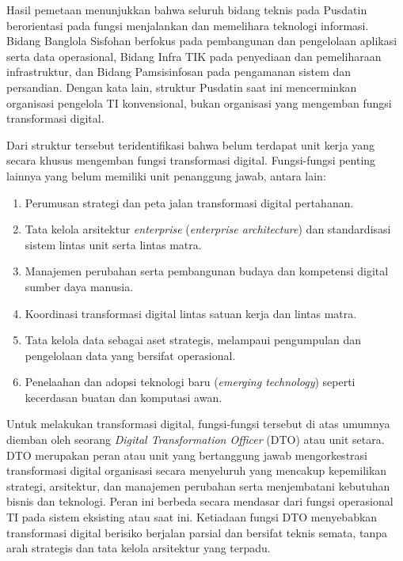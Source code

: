 Hasil pemetaan menunjukkan bahwa seluruh bidang teknis pada Pusdatin berorientasi pada fungsi menjalankan dan memelihara teknologi informasi.
Bidang Banglola Sisfohan berfokus pada pembangunan dan pengelolaan aplikasi serta data operasional, Bidang Infra TIK pada penyediaan dan pemeliharaan infrastruktur, dan Bidang Pamsisinfosan pada pengamanan sistem dan persandian.
Dengan kata lain, struktur Pusdatin saat ini mencerminkan organisasi pengelola TI konvensional, bukan organisasi yang mengemban fungsi transformasi digital.

Dari struktur tersebut teridentifikasi bahwa belum terdapat unit kerja yang secara khusus mengemban fungsi transformasi digital. Fungsi-fungsi penting lainnya yang belum memiliki unit penanggung jawab, antara lain:
\begin{enumerate}
  \item Perumusan strategi dan peta jalan transformasi digital pertahanan.
  \item Tata kelola arsitektur \textit{enterprise} (\textit{enterprise architecture}) dan standardisasi sistem lintas unit serta lintas matra.
  \item Manajemen perubahan serta pembangunan budaya dan kompetensi digital sumber daya manusia.
  \item Koordinasi transformasi digital lintas satuan kerja dan lintas matra.
  \item Tata kelola data sebagai aset strategis, melampaui pengumpulan dan pengelolaan data yang bersifat operasional.
  \item Penelaahan dan adopsi teknologi baru (\textit{emerging technology}) seperti kecerdasan buatan dan komputasi awan.
\end{enumerate}

Untuk melakukan transformasi digital, fungsi-fungsi tersebut di atas umumnya diemban oleh seorang \textit{Digital Transformation Officer} (DTO) atau unit setara.
DTO merupakan peran atau unit yang bertanggung jawab mengorkestrasi transformasi digital organisasi secara menyeluruh yang mencakup kepemilikan strategi, arsitektur, dan manajemen perubahan serta menjembatani kebutuhan bisnis dan teknologi.
Peran ini berbeda secara mendasar dari fungsi operasional TI pada sistem eksisting atau saat ini.
Ketiadaan fungsi DTO menyebabkan transformasi digital berisiko berjalan parsial dan bersifat teknis semata, tanpa arah strategis dan tata kelola arsitektur yang terpadu.

